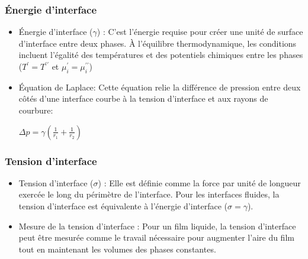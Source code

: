 \documentclass{article}
\begin{document}
        \subsubsection{Énergie d'interface}
        \begin{itemize}
            \item Énergie d'interface ($\gamma$) : C'est l'énergie requise pour créer une unité de surface d'interface entre deux phases. À l'équilibre thermodynamique, les conditions incluent l'égalité des températures et des potentiels chimiques entre les phases ($T^\prime = T^{\prime\prime}$ et $\mu_i^\prime = \mu_i^{\prime\prime}$)
            \item Équation de Laplace: Cette équation relie la différence de pression entre deux côtés d'une interface courbe à la tension d'interface et aux rayons de courbure:
            \begin{center}
                $\Delta p = \gamma (\frac{1}{r_1}+\frac{1}{r_2})$
            \end{center}
        \end{itemize}

        \subsubsection{Tension d'interface}
        \begin{itemize}
            \item Tension d'interface ($\sigma$) : Elle est définie comme la force par unité de longueur exercée le long du périmètre de l'interface. Pour les interfaces fluides, la tension d'interface est équivalente à l'énergie d'interface ($\sigma = \gamma$).
            \item Mesure de la tension d'interface : Pour un film liquide, la tension d'interface peut être mesurée comme le travail nécessaire pour augmenter l'aire du film tout en maintenant les volumes des phases constantes.
        \end{itemize}
        \pagebreak
        
\end{document}
